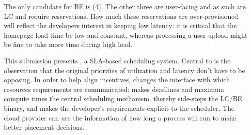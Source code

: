 The only candidate for BE is (4). The other three are user-facing and as such
are LC and require reservations. How much these reservations are
over-provisioned will reflect the developers interest in keeping low latency: it
is critical that the homepage load time be low and constant, whereas processing
a user upload might be fine to take more time during high load.

This submission presents \textit{\sysname}, a SLA-based scheduling system.
Central to \sysname{} is the observation that the original priorities of
utilization and latency don't have to be opposing. In order to help align
incentives, \sysname{} changes the interface with which resources requirements
are communicated: \sysname{} makes deadlines and maximum compute times the
central scheduling mechanism. \sysname{} thereby side-steps the LC/BE binary,
and makes the developer's requirements explicit to the scheduler. The cloud
provider can use the information of how long a process will run to make better
placement decisions.
